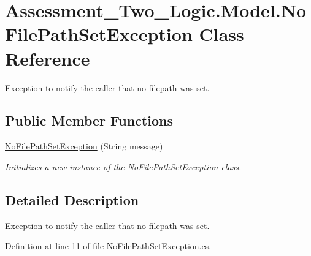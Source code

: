 \hypertarget{class_assessment___two___logic_1_1_model_1_1_no_file_path_set_exception}{
\section{Assessment\_\-Two\_\-Logic.Model.NoFilePathSetException Class Reference}
\label{class_assessment___two___logic_1_1_model_1_1_no_file_path_set_exception}
}


Exception to notify the caller that no filepath was set.  


\subsection*{Public Member Functions}
\begin{DoxyCompactItemize}
\item 
\hyperlink{class_assessment___two___logic_1_1_model_1_1_no_file_path_set_exception_a065f8de2de8a5afc3dea3ce8334c422a}{NoFilePathSetException} (String message)
\begin{DoxyCompactList}\small\item\em Initializes a new instance of the \hyperlink{class_assessment___two___logic_1_1_model_1_1_no_file_path_set_exception}{NoFilePathSetException} class. \item\end{DoxyCompactList}\end{DoxyCompactItemize}


\subsection{Detailed Description}
Exception to notify the caller that no filepath was set. 

Definition at line 11 of file NoFilePathSetException.cs.



